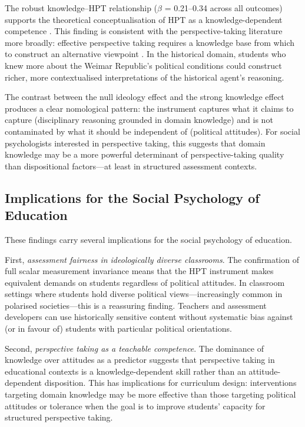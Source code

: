 \documentclass[referee,pdflatex,sn-apa]{sn-jnl}
\begin{document}
The robust knowledge--HPT relationship ($\beta$ = 0.21--0.34 across all outcomes) supports the theoretical conceptualisation of HPT as a knowledge-dependent competence \citep{Hartmann2008,Chapman2021,Wineburg2001}. This finding is consistent with the perspective-taking literature more broadly: effective perspective taking requires a knowledge base from which to construct an alternative viewpoint \citep{Galinsky2005}. In the historical domain, students who knew more about the Weimar Republic's political conditions could construct richer, more contextualised interpretations of the historical agent's reasoning.

The contrast between the null ideology effect and the strong knowledge effect produces a clear nomological pattern: the instrument captures what it claims to capture (disciplinary reasoning grounded in domain knowledge) and is not contaminated by what it should be independent of (political attitudes). For social psychologists interested in perspective taking, this suggests that domain knowledge may be a more powerful determinant of perspective-taking quality than dispositional factors---at least in structured assessment contexts.

\subsection{Implications for the Social Psychology of Education}\label{subsec:implications}

These findings carry several implications for the social psychology of education.

First, \textit{assessment fairness in ideologically diverse classrooms}. The confirmation of full scalar measurement invariance means that the HPT instrument makes equivalent demands on students regardless of political attitudes. In classroom settings where students hold diverse political views---increasingly common in polarised societies---this is a reassuring finding. Teachers and assessment developers can use historically sensitive content without systematic bias against (or in favour of) students with particular political orientations.

Second, \textit{perspective taking as a teachable competence}. The dominance of knowledge over attitudes as a predictor suggests that perspective taking in educational contexts is a knowledge-dependent skill rather than an attitude-dependent disposition. This has implications for curriculum design: interventions targeting domain knowledge may be more effective than those targeting political attitudes or tolerance when the goal is to improve students' capacity for structured perspective taking.
\end{document}

